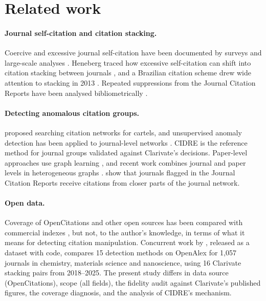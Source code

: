 \section{Related work}\label{sec:related}

\paragraph{Journal self-citation and citation stacking.}
Coercive and excessive journal self-citation have been documented by surveys and large-scale analyses
\citep{wilhite2012coercive,chorus2016coercive,taskin2021selfcitation}. Heneberg traced how excessive self-citation can
shift into citation stacking between journals \citep{heneberg2016stacking}, and a Brazilian citation scheme drew wide
attention to stacking in 2013 \citep{vannoorden2013brazil}. Repeated suppressions from the Journal Citation Reports
have been analysed bibliometrically \citep{moussa2022suppressed}.

\paragraph{Detecting anomalous citation groups.}
\citet{fister2016cartels} proposed searching citation networks for cartels, and unsupervised anomaly
detection has been applied to journal-level networks \citep{jolly2020anomaly}. CIDRE \citep{kojaku2021cidre} is the
reference method for journal groups validated against Clarivate's decisions. Paper-level approaches use graph learning
\citep{liu2022tnnls}, and recent work combines journal and paper levels in heterogeneous graphs \citep{liu2026isf}.
\citet{barnes2026distance} show that journals flagged in the Journal Citation Reports receive citations from closer parts of the
journal network.

\paragraph{Open data.}
Coverage of OpenCitations and other open sources has been compared with commercial indexes
\citep{martinmartin2021coverage,visser2021comparison,culbert2025openalex}, but not, to the author's knowledge, in terms of what it
means for detecting citation manipulation. Concurrent work by \citet{zhang2026openalex}, released as a dataset
with code, compares 15 detection methods on OpenAlex for 1,057 journals in chemistry, materials science and
nanoscience, using 16 Clarivate stacking pairs from 2018--2025. The present study differs in data source (OpenCitations), scope (all
fields), the fidelity audit against Clarivate's published figures, the coverage diagnosis, and the analysis of
CIDRE's mechanism.

